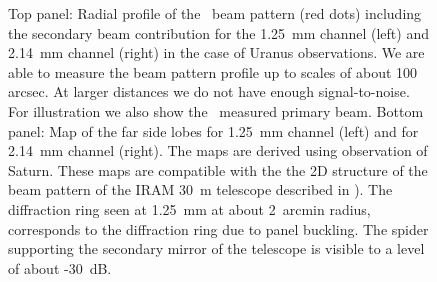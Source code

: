 \begin{figure}[t!]
\begin{center}
\end{center}
\caption{Top panel: Radial profile of the \NIKA\ beam pattern (red dots) including the secondary beam contribution for the 1.25~mm channel (left) and 2.14~mm channel (right) in the case of Uranus observations. We are able to measure the beam pattern profile up to scales of about 100 arcsec. At larger distances we do not have enough signal-to-noise. For illustration we also show the \NIKA\ measured primary beam. 
 Bottom panel: Map of the far side lobes for 1.25~mm channel (left) and for 2.14~mm channel (right). The maps are derived using observation of Saturn. These maps are compatible with the  the 2D structure of the beam pattern of the IRAM 30~m telescope described in \citep{Greve,kramer}). The diffraction ring seen at 1.25~mm at about 2~arcmin radius, corresponds to the diffraction ring  due to panel buckling. The spider supporting the secondary mirror of the telescope is visible to a level of about -30~dB.}
\label{fig:fsl}
   \end{figure} 


